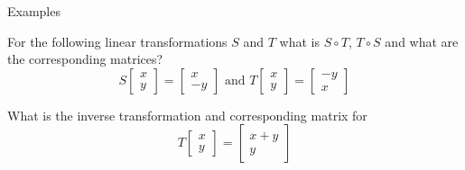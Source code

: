 \documentclass{beamer}
\begin{document}
\begin{frame}{Examples}
\begin{example}
For the following linear transformations $S$ and $T$ what is $S\circ T$, $T\circ S$ and what are the corresponding matrices?
\begin{equation*}
S \left[
\begin{array}{c}
x\\
y
\end{array}
\right] = \left[
\begin{array}{c}
x\\
-y
\end{array}
\right]\text{ and } T \left[
\begin{array}{c}
x\\
y
\end{array}
\right] = \left[
\begin{array}{c}
-y\\
x
\end{array}
\right]
\end{equation*}
\end{example}
\begin{example}
What is the inverse transformation and corresponding matrix for
\begin{equation*}
T \left[
\begin{array}{c}
x\\
y
\end{array}
\right] = \left[
\begin{array}{c}
x+y\\
y
\end{array}
\right]
\end{equation*}
\end{example}
\end{frame}
\end{document}
